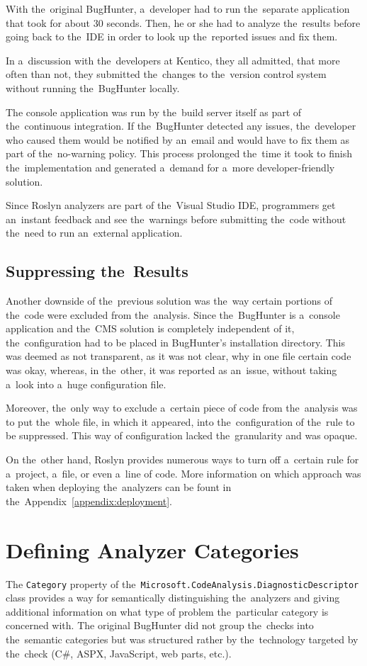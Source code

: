 \documentclass[
  digital, %
  table,   %
  lof,     %
  lot,     %
  oneside,
]{fithesis3}
\begin{document}
With the~original BugHunter, a~developer had to run the~separate application that took for about 30 seconds. Then, he or she had to analyze the~results before going back to the~IDE in order to look up the~reported issues and fix them. 

In a~discussion with the~developers at Kentico, they all admitted, that more often than not, they submitted the~changes to the~version control system without running the~BugHunter locally. 

The console application was run by the~build server itself as part of the~continuous integration. If the~BugHunter detected any issues, the~developer who caused them would be notified by an~email and would have to fix them as part of the~no-warning policy. This process prolonged the~time it took to finish the~implementation and generated a~demand for a~more developer-friendly solution. 

Since Roslyn analyzers are part of the~Visual Studio IDE, programmers get an~instant feedback and see the~warnings before submitting the~code without the~need to run an~external application.

\subsection{Suppressing the~Results}
Another downside of the~previous solution was the~way certain portions of the~code were excluded from the~analysis. Since the~BugHunter is a~console application and the~CMS solution is completely independent of it, the~configuration had to be placed in BugHunter's installation directory. This was deemed as not transparent, as it was not clear, why in one file certain code was okay, whereas, in the~other, it was reported as an~issue, without taking a~look into a~huge configuration file.

Moreover, the~only way to exclude a~certain piece of code from the~analysis was to put the~whole file, in which it appeared, into the~configuration of the~rule to be suppressed. This way of configuration lacked the~granularity and was opaque. 

On the~other hand, Roslyn provides numerous ways to turn off a~certain rule for a~project, a~file, or even a~line of code. More information on which approach was taken when deploying the~analyzers can be fount in the~Appendix~\ref{appendix:deployment}.

\section{Defining Analyzer Categories}
\label{sec:analyzer-categories}
The \texttt{Category} property of the~\texttt{Microsoft.CodeAnalysis.DiagnosticDescriptor} class provides a way for semantically distinguishing the~analyzers and giving additional information on what type of problem the~particular category is concerned with. The original BugHunter did not group the~checks into the~semantic categories but was structured rather by the~technology targeted by the~check (C\#, ASPX, JavaScript, web parts, etc.). 
\end{document}
